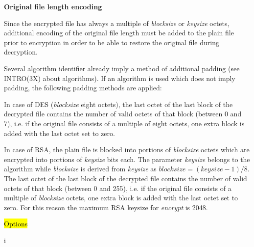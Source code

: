 {\bf Original file length encoding}

Since the encrypted file has always a multiple of {\em blocksize} or {\em keysize} octets,
additional encoding of the original file length must be added to the plain file prior
to encryption in order to be able to restore the original file during decryption.
 
Several algorithm identifier already imply a method of additional padding (see INTRO(3X)
about algorithms). If an algorithm is used which does not imply padding, the
following padding methods are applied:
 
In case of DES ({\em blocksize} eight octets), the last octet of the last block of the
decrypted file contains the number of valid octets of that block (between 0 and 7), i.e.
if the original file consists of a multiple of eight octets, one extra block is added
with the last octet set to zero.

In case of RSA, the plain file is blocked into portions of {\em blocksize} octets which
are encrypted into portions of {\em keysize} bits each. The parameter {\em keysize}
belongs to the algorithm while {\em blocksize} is derived from {\em keysize} as
$blocksize = (keysize - 1)/8$. The last octet of the last block of the
decrypted file contains the number of valid octets of that block (between 0 and 255), i.e.
if the original file consists of a multiple of {\em blocksize} octets, one extra block is added
with the last octet set to zero. For this reason the maximum RSA keysize for {\em encrypt}
is 2048.

\hl{Options}

 
i  
 
